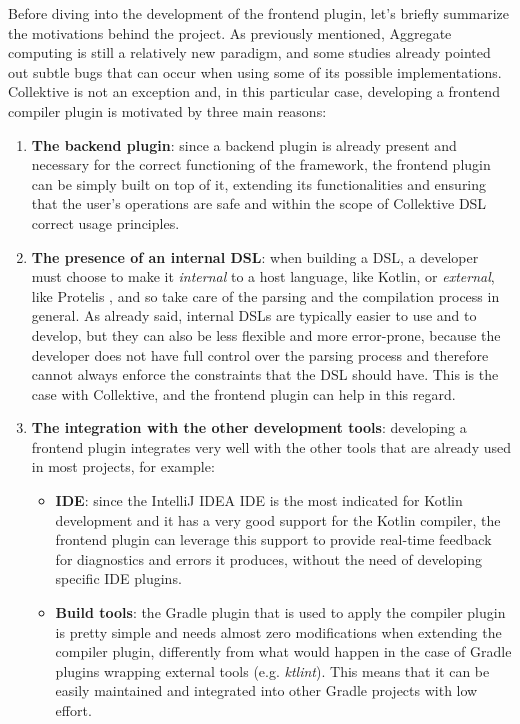 \documentclass[12pt,a4paper,openright,twoside]{book}
\begin{document}
Before diving into the development of the frontend plugin, let's briefly
summarize the motivations behind the project. As previously mentioned, Aggregate
computing is still a relatively new paradigm, and some studies
\cite{DBLP:conf/saso/AudritoDVC16} already pointed out subtle bugs that can
occur when using some of its possible implementations. 
%
Collektive is not an exception and, in this particular case, developing a
frontend compiler plugin is motivated by three main reasons:
\begin{enumerate}
  \item \textbf{The backend plugin}: since a backend plugin is already present
  and necessary for the correct functioning of the framework, the frontend
  plugin can be simply built on top of it, extending its functionalities and
  ensuring that the user's operations are safe and within the scope of
  Collektive DSL correct usage principles.

  \item \textbf{The presence of an internal DSL}: when building a DSL, a
  developer must choose to make it \emph{internal} to a host language, like
  Kotlin, or \emph{external}, like Protelis \cite{DBLP:conf/saso/PianiniBV17},
  and so take care of the parsing and the compilation process in general.
  As already said, internal \acp{DSL} are typically easier to use and to
  develop, but they can also be less flexible and more error-prone, because the
  developer does not have full control over the parsing process and therefore
  cannot always enforce the constraints that the DSL should have. This is the
  case with Collektive, and the frontend plugin can help in this regard.
  
  \item \textbf{The integration with the other development tools}: developing a
  frontend plugin integrates very well with the other tools that are already 
  used in most projects, for example:

  \begin{itemize}
    \item \textbf{IDE}: since the IntelliJ IDEA \ac{IDE} is the most indicated
    for Kotlin development and it has a very good support for the Kotlin
    compiler, the frontend plugin can leverage this support to provide real-time
    feedback for diagnostics and errors it produces, without the need of
    developing specific \ac{IDE} plugins.

    \item \textbf{Build tools}: the Gradle plugin that is used to apply the
    compiler plugin is pretty simple and needs almost zero modifications when
    extending the compiler plugin, differently from what would happen in the
    case of Gradle plugins wrapping external tools (e.g. \emph{ktlint}). This
    means that it can be easily maintained and integrated into other Gradle
    projects with low effort.


\end{itemize}
\end{enumerate}
\end{document}
